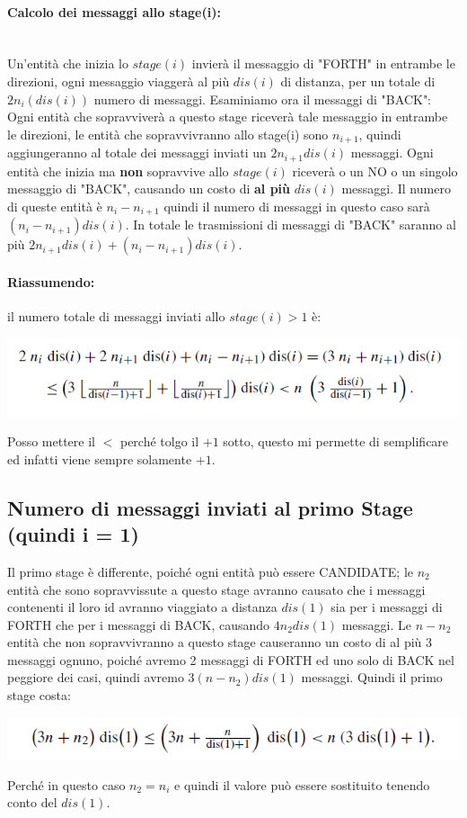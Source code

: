 \paragraph{Calcolo dei messaggi allo stage(i):}\ \\
Un'entità che inizia lo $stage(i)$ invierà il messaggio di "FORTH" in entrambe
le direzioni, ogni messaggio viaggerà al più $dis(i)$ di distanza, per un totale
di $2n_i(dis(i))$ numero di messaggi. Esaminiamo ora il messaggi di "BACK": Ogni
entità che sopravviverà a questo stage riceverà tale messaggio in entrambe le
direzioni, le entità che sopravvivranno allo stage(i) sono $n_{i+1}$, quindi
aggiungeranno al totale dei messaggi inviati un $2n_{i+1}dis(i)$ messaggi. Ogni
entità che inizia ma \textbf{non} sopravvive allo $stage(i)$ riceverà o un NO o
un singolo messaggio di "BACK", causando un costo di \textbf{al più} $dis(i)$
messaggi. Il numero di queste entità è $n_i - n_{i+1}$ quindi il numero di
messaggi in questo caso sarà  $(n_i - n_{i+1})dis(i)$. In totale le trasmissioni
di messaggi di "BACK" saranno al più $2n_{i+1}dis(i) + (n_i - n_{i+1})dis(i)$.

\paragraph{Riassumendo:} il numero totale di messaggi inviati allo $stage(i) > 1$
è:
\begin{center}
    \includegraphics[scale=0.6]{capitoli/leader-election/imgs/bb.png}
\end{center}
Posso mettere il $<$ perché tolgo il $+1$ sotto, questo mi permette di
semplificare ed infatti viene sempre solamente $+1$.


\subsection{Numero di messaggi inviati al primo Stage (quindi i = 1)}
Il primo stage è differente, poiché ogni entità può essere CANDIDATE; le $n_2$
entità che sono sopravvissute a questo stage avranno causato che i messaggi
contenenti il loro id avranno viaggiato a distanza $dis(1)$ sia per i messaggi
di FORTH che per i messaggi di BACK, causando $4n_2dis(1)$ messaggi. Le $n-n_2$
entità che non sopravvivranno a  questo stage causeranno un costo di al più 3
messaggi ognuno, poiché avremo 2 messaggi di FORTH ed uno solo di BACK nel
peggiore dei casi, quindi avremo $3(n - n_2)dis(1)$ messaggi. Quindi il primo
stage costa:
\begin{center}
    \includegraphics[scale=0.6]{capitoli/leader-election/imgs/cc.png}
\end{center}
Perché in questo caso $n_2 = n_i$ e quindi il valore può essere sostituito
tenendo conto del $dis(1)$.

